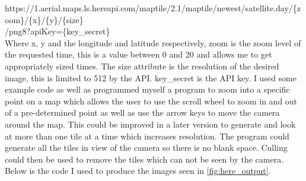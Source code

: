 \documentclass{article}
\begin{document}
            \noindent
            https://1.aerial.maps.ls.hereapi.com/maptile/2.1/maptile/newest/satellite.day/\{zoom\}/\{x\}/\{y\}/\{size\} \\ /png8?apiKey=\{key\_secret\} \\

            Where x, y and the longitude and latitude respectively, zoom is the zoom level of the requested time, this is a value between 0 and 20 and allows me to get appropriately sized times. The size attribute is the resolution of the desired image, this is limited to 512 by the API. key\_secret is the API key. I used some example code as well as programmed myself a program to zoom into a specific point on a map which allows the user to use the scroll wheel to zoom in and out of a pre-determined point as well as use the arrow keys to move the camera around the map. This could be improved in a later version to generate and look at more than one tile at a time which increases resolution. The program could generate all the tiles in view of the camera so there is no blank space. Culling could then be used to remove the tiles which can not be seen by the camera. Below is the code I used to produce the images seen in \cref{fig:here_output}.

        
        
            \lstset{style=mystyle}
            
            
\end{document}
